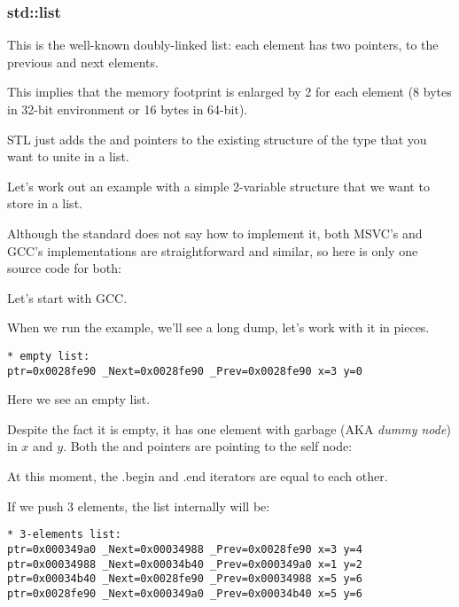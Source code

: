 \subsubsection{std::list}
\label{std_list}

This is the well-known doubly-linked list: each element has two pointers, to the previous and next
elements.

This implies that the memory footprint is enlarged by 2  for each element (8 bytes in 32-bit environment or 16 bytes in 64-bit).

\Cpp STL just adds the  and  pointers to the existing structure of the type that you want to 
unite in a list.

Let's work out an example with a simple 2-variable structure that we want to store in a list.

Although the \Cpp standard does not say how to implement it, 
both MSVC's and GCC's implementations are straightforward and similar, so here is only one
source code for both:




Let's start with GCC.

When we run the example, we'll see a long dump, let's work with it in pieces.

\begin{lstlisting}
* empty list:
ptr=0x0028fe90 _Next=0x0028fe90 _Prev=0x0028fe90 x=3 y=0
\end{lstlisting}

Here we see an empty list.

Despite the fact it is empty, it has one element with garbage (\ac{AKA} \emph{dummy node})
in $x$ and $y$.
Both the  and  pointers are pointing to the self node:



At this moment, the .begin and .end iterators are equal to each other.

If we push 3 elements, the list internally will be:

\begin{lstlisting}
* 3-elements list:
ptr=0x000349a0 _Next=0x00034988 _Prev=0x0028fe90 x=3 y=4
ptr=0x00034988 _Next=0x00034b40 _Prev=0x000349a0 x=1 y=2
ptr=0x00034b40 _Next=0x0028fe90 _Prev=0x00034988 x=5 y=6
ptr=0x0028fe90 _Next=0x000349a0 _Prev=0x00034b40 x=5 y=6
\end{lstlisting}

